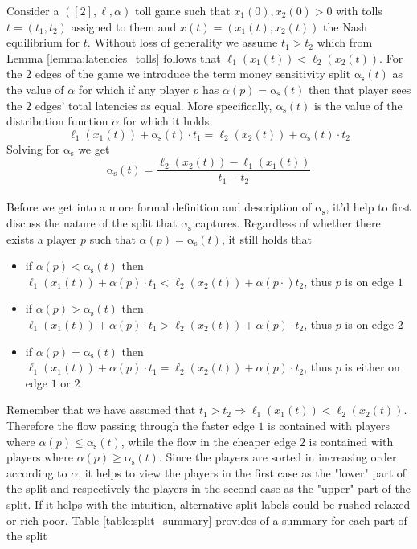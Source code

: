 \documentclass[10pt,a4paper]{book}
\newcommand{\as}{\mathrm{\alpha_s}}
\theoremstyle{definition}
\theoremstyle{comment}
\begin{document}
Consider a $([2], \ell, \alpha)$ toll game such that $x_1(0), x_2(0) > 0$ with tolls $t = (t_1, t_2)$ assigned to them and  $x(t) = (x_1(t), x_2(t))$ the Nash equilibrium for $t$.
Without loss of generality we assume $t_1 > t_2$ which from Lemma \ref{lemma:latencies_tolls} follows that $\ell_1(x_1(t)) < \ell_2(x_2(t))$.
For the $2$ edges of the game we introduce the term money sensitivity split $\as(t)$ as the value of $\alpha$ for which if any player $p$ has $\alpha(p)=\as(t)$ then that player sees the $2$ edges' total latencies as equal.
More specifically, $\as(t)$ is the value of the distribution function $\alpha$ for which it holds
\[\ell_1(x_1(t)) + \as(t) \cdot t_1 = \ell_2(x_2(t)) + \as(t) \cdot t_2\]
Solving for $\as$ we get
\[\as(t) = \frac{\ell_2(x_2(t)) - \ell_1(x_1(t))}{t_1 - t_2}\]
\\
Before we get into a more formal definition and description of $\as$, it'd help to first discuss the nature of the split that $\as$ captures.
Regardless of whether there exists a player $p$ such that $\alpha(p) = \as(t)$, it still holds that
\begin{itemize}
	\item if $\alpha(p) < \as(t)$ then $\ell_1(x_1(t)) + \alpha(p) \cdot t_1 < \ell_2(x_2(t)) + \alpha(p \cdot) t_2$, thus $p$ is on edge $1$
	\item if $\alpha(p) > \as(t)$ then $\ell_1(x_1(t)) + \alpha(p) \cdot t_1 > \ell_2(x_2(t)) + \alpha(p) \cdot t_2$, thus $p$ is on edge $2$
	\item if $\alpha(p) = \as(t)$ then $\ell_1(x_1(t)) + \alpha(p) \cdot t_1 = \ell_2(x_2(t)) + \alpha(p) \cdot t_2$, thus $p$ is either on edge $1$ or $2$
\end{itemize}
Remember that we have assumed that $t_1 > t_2 \Rightarrow \ell_1(x_1(t)) < \ell_2(x_2(t))$.
Therefore the flow passing through the faster edge $1$ is contained with players where $\alpha(p) \le \as(t)$, while the flow in the cheaper edge $2$ is contained with players where $\alpha(p) \ge \as(t)$.
Since the players are sorted in increasing order according to $\alpha$, it helps to view the players in the first case as the "lower" part of the split and respectively the players in the second case as the "upper" part of the split.
If it helps with the intuition, alternative split labels could be rushed-relaxed or rich-poor.
Table \autoref{table:split_summary} provides of a summary for each part of the split
\end{document}
